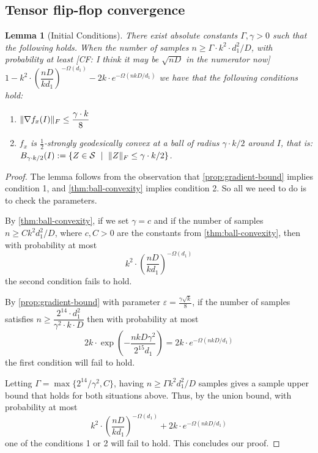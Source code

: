 \documentclass[aos]{imsart}
\newtheorem{lemma}[theorem]{Lemma}
\theoremstyle{definition}
\numberwithin{equation}{section}
\DeclarePairedDelimiter{\norm}{\lVert}{\rVert}
\newcommand{\Sym}{\mathcal{S}}
\newcommand{\smallSym}{S}
\newcommand{\CF}[1]{{\color{purple}[CF: #1]}}
\begin{document}
\subsection{Tensor flip-flop convergence}
\begin{lemma}[Initial Conditions]\label{lem:tensor-initial-conditions}
	There exist absolute constants $\Gamma, \gamma > 0$ such that the following holds.
	When the number of samples $n \geq \Gamma \cdot k^2 \cdot d_1^2/D$, with probability at least \CF{I think it may be $\sqrt{nD}$ in the numerator now} $1 - k^2 \cdot \left( \dfrac{nD}{k d_1} \right)^{-\Omega(d_1)} - 2k \cdot e^{- \Omega(nkD/d_1)}$ we have that the following conditions hold:
	\begin{enumerate}
		\item $\norm{\nabla f_x(I)}_F \leq \dfrac{\gamma \cdot k}{8}$ %
		\item $f_x$ is $\frac{1}{2}$-strongly geodesically convex at a ball of radius $\gamma \cdot k/2$ around $I$, that is: $B_{\gamma \cdot k/2}(I) := \{ Z \in \Sym \ \mid \ \norm{Z}_F \leq \gamma \cdot k/2 \}$.
	\end{enumerate}
\end{lemma}

\begin{proof}
	The lemma follows from the observation that \cref{prop:gradient-bound} implies condition 1, and \cref{thm:ball-convexity} implies condition 2. So all we need to do is to check the parameters.

	By \cref{thm:ball-convexity}, if we set $\gamma = c$ and if the number of samples $n \geq C k^2 d_1^2/D$, where $c, C > 0$ are the constants from \cref{thm:ball-convexity}, then with probability at most
	$$k^2 \cdot \left( \dfrac{nD}{k d_1} \right)^{-\Omega(d_1)}$$
	the second condition fails to hold.

	By \cref{prop:gradient-bound} with parameter $\varepsilon = \frac{\gamma \sqrt{k}}{8}$, if the number of samples satisfies $n \geq \dfrac{2^{14} \cdot d_1^2}{\gamma^2 \cdot k \cdot D}$ then with probability at most
	$$2 k \cdot \exp\left(- \frac{n k D \gamma^2}{2^{15} d_1}\right) = 2k \cdot e^{- \Omega(nkD/d_1)}$$
	the first condition will fail to hold.

	Letting $\Gamma = \max\{2^{14}/\gamma^2, C \}$, having $n \geq \Gamma k^2 d_1^2/D$ samples gives a sample upper bound that holds for both situations above.
	Thus, by the union bound, with probability at most
	$$ k^2 \cdot \left( \dfrac{nD}{k d_1} \right)^{-\Omega(d_1)} + 2k \cdot e^{- \Omega(nkD/d_1)} $$
	one of the conditions 1 or 2 will fail to hold. This concludes our proof.
\end{proof}
\end{document}
